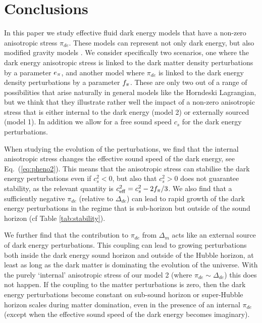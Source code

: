 \section{Conclusions}
\label{chapter-ade:conclusions}

In this paper we study effective fluid dark energy models that have a non-zero anisotropic stress $\pi_{de}$. These models
can represent not only dark energy, but also modified gravity models \cite{Kunz:2006ca}. We consider specifically two
scenarios, one where the dark energy anisotropic stress is linked to the dark matter density perturbations by a parameter $\aa$, and
another model where $\pi_{de}$ is linked to the dark energy density perturbations by a parameter $\ff$. These are only two out
of a range of possibilities that arise naturally in general models like the Horndeski Lagrangian, but we think that
they illustrate rather well the impact of a non-zero anisotropic stress that is either internal to the dark energy (model 2)
or externally sourced (model 1). In addition we allow for a free sound speed $c_s$ for the dark energy perturbations.

When studying the evolution of the perturbations, we find that
the internal anisotropic stress changes the effective sound speed of the dark energy, see Eq.\ (\ref{eq:pheno2}).
This means that the anisotropic stress can stabilise the dark energy perturbations even if $c_s^2<0$, but also that
$c_s^2>0$ does not guarantee stability, as the relevant quantity is $\ceff^2=c_s^2 - 2\ff / 3$. We also find that a sufficiently negative
$\pi_{de}$ (relative to $\Delta_{de}$) can lead to rapid growth of the dark energy perturbations in the regime that is sub-horizon
but outside of the sound horizon (cf Table \ref{tab:stability}).

We further find that the contribution to $\pi_{de}$ from $\Delta_m$ acts like
an external source of dark energy perturbations. This coupling can lead to growing perturbations both inside the
dark energy sound horizon and outside of the Hubble horizon, at least as long as the dark matter is dominating the
evolution of the universe. With the purely `internal' anisotropic stress of our
model 2 (where $\pi_{de} \sim \Delta_{de}$) this does not happen. If the coupling to the matter perturbations is zero,
then the dark energy perturbations become constant on sub-sound horizon or super-Hubble horizon scales during
matter domination, even in the presence of an internal $\pi_{de}$ (except when the effective sound speed of the
dark energy becomes imaginary).

